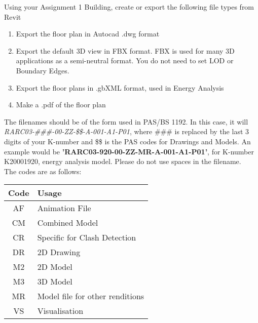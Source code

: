 Using your Assignment 1 Building, create or export the following file types from Revit
\begin{enumerate}
	\item Export the floor plan in Autocad .dwg format
	\item Export the default 3D view in FBX format.  FBX is used for many 3D applications as a semi-neutral format.  You do not need to set LOD or Boundary Edges.
	\item Export the floor plans in .gbXML format, used in Energy Analysis
	\item Make a .pdf of the floor plan
\end{enumerate}
The filenames should be of the form used in PAS/BS 1192.  In this case, it will \textit{RARC03-\#\#\#-00-ZZ-\$\$-A-001-A1-P01}, where \#\#\# is replaced by the last 3 digits of your K-number and \$\$ is the PAS codes for Drawings and Models. An example would be \textbf{'RARC03-920-00-ZZ-MR-A-001-A1-P01'}, for K-number K20001920, energy analysis model.  Please do not use spaces in the filename.\\ The codes are as follows: \\

\begin{tabularx}{\textwidth}{ |c|X| }
	\hline
	\textbf{Code} & \textbf{Usage} \\
	\hline 
	AF  & Animation File  \\
	CM  & Combined Model  \\
	CR  & Specific for Clash Detection  \\
	DR  & 2D Drawing  \\
	M2  & 2D Model  \\
	M3  & 3D Model  \\
	MR  & Model file for other renditions  \\
	VS  & Visualisation  \\
	\hline
\end{tabularx}


